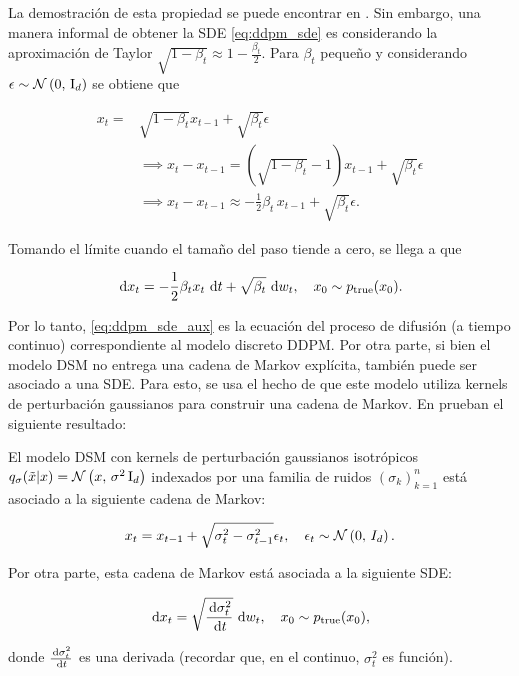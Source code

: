 La demostración de esta propiedad se puede encontrar en \cite{song2021scorebased}. Sin embargo, una manera informal de obtener la SDE \eqref{eq:ddpm_sde} es considerando la aproximación de Taylor $\sqrt{1 - \beta_t} \approx 1 - \frac{\beta_t}{2}$. Para $\beta_t$ pequeño y considerando $\epsilon\sim\mathcal{N}\left(0,\,\operatorname{I}_{d}\right)$ se obtiene que

\begin{align*}
    x_t =& \sqrt{1 - \beta_t} x_{t-1} + \sqrt{\beta_t} \epsilon\\
    &\implies x_t - x_{t-1} = (\sqrt{1 - \beta_t} - 1) x_{t-1} + \sqrt{\beta_t} \epsilon\\
    &\implies x_t - x_{t-1} \approx -\frac{1}{2}\beta_t\, x_{t-1} + \sqrt{\beta_t} \epsilon .
\end{align*}

Tomando el límite cuando el tamaño del paso tiende a cero, se llega a que

\begin{equation*}
    \label{eq:ddpm_sde_aux}
    \,\operatorname{d}\! x_t = -\frac{1}{2} \beta_t x_t \,\operatorname{d}\! t + \sqrt{\beta_t} \,\operatorname{d}\! w_t, \quad x_0\sim p_{\operatorname{true}}(x_0).
\end{equation*}

Por lo tanto, \eqref{eq:ddpm_sde_aux} es la ecuación del proceso de difusión (a tiempo continuo) correspondiente al modelo discreto DDPM. Por otra parte, si bien el modelo DSM no entrega una cadena de Markov explícita, también puede ser asociado a una SDE. Para esto, se usa el hecho de que este modelo utiliza kernels de perturbación gaussianos para construir una cadena de Markov. En \cite{song2021scorebased} prueban el siguiente resultado:

\begin{prop}
    El modelo DSM con kernels de perturbación gaussianos isotrópicos $q_{\sigma}(\tilde x|x)=\mathcal{N}\left(x,\,\sigma^2\operatorname{I}_{d}\right)$ indexados por una familia de ruidos $(\sigma_k)_{k=1}^n$ está asociado a la siguiente cadena de Markov:

    \begin{equation*}
        x_t = x_{t-1} + \sqrt{\sigma_t^2-\sigma^2_{t-1}} \epsilon_t,\quad \epsilon_t\sim\mathcal{N}\left(0,\,I_d\right).
    \end{equation*}

    Por otra parte, esta cadena de Markov está asociada a la siguiente SDE:

    \begin{equation}
        \label{eq:sdm_sde}
        \,\operatorname{d}\! x_t = \sqrt{\frac{\,\operatorname{d}\!\sigma_t^2}{\,\operatorname{d}\! t}}\,\operatorname{d}\! w_t, \quad x_0\sim p_{\operatorname{true}}(x_0),
    \end{equation}

    donde $\frac{\,\operatorname{d}\!\sigma_t^2}{\,\operatorname{d}\! t}$ es una derivada (recordar que, en el continuo, $\sigma_t^2$ es función).
\end{prop}

